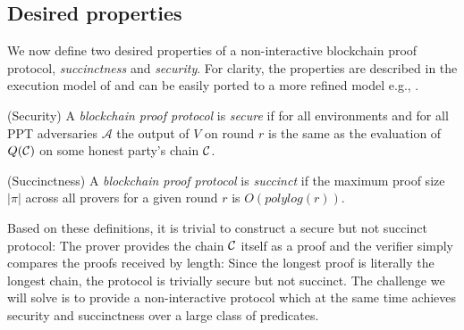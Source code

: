 \subsection{Desired properties}

We now define two desired properties of a non-interactive blockchain proof protocol, \textit{succinctness} and \textit{security}. For clarity, the properties are described in the execution model of \cite{backbone} and can be easily ported to a more refined model e.g., \cite{PSS}.

\begin{definition}{(Security)}
A \textit{blockchain proof protocol} is \textit{secure} if for all environments
and for all PPT adversaries $\mathcal{A}$ the output of $V$ on round $r$ is the
same as the evaluation of $Q(\mathcal{C})$ on some honest party's chain $\mathcal{C}$.
\end{definition}

\begin{definition}{(Succinctness)}
A \textit{blockchain proof protocol} is \textit{succinct} if the maximum proof
size $|\pi|$ across all provers for a given round $r$ is $O(polylog(r))$.
\end{definition}

Based on these definitions, it is trivial to construct a secure but not succinct
protocol: The prover provides the chain $\mathcal{C}$ itself as a proof and the
verifier simply compares the proofs received by length: Since the longest proof
is literally the longest chain, the protocol is trivially secure but not
succinct. The challenge we will solve is to provide a
non-interactive protocol which at the same time achieves security and
succinctness over a large class of predicates.
